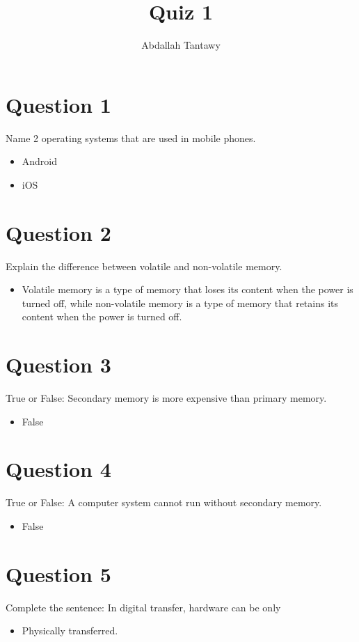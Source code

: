 \documentclass{article}
\title{Quiz 1}
\author{Abdallah Tantawy}
\begin{document}
\maketitle

\section*{Question 1}
Name 2 operating systems that are used in mobile phones.
\begin{itemize}[label=\alph*.]
    \item Android
    \item iOS
\end{itemize}

\section*{Question 2}
Explain the difference between volatile and non-volatile memory.
\begin{itemize}[label=\alph*.]
    \item Volatile memory is a type of memory that loses its content when the power is turned off, while non-volatile memory is a type of memory that retains its content when the power is turned off.
\end{itemize}

\section*{Question 3}
True or False: Secondary memory is more expensive than primary memory.
\begin{itemize}[label=\alph*.]
    \item False
\end{itemize}

\section*{Question 4}
True or False: A computer system cannot run without secondary memory.
\begin{itemize}[label=\alph*.]
    \item False
\end{itemize}

\section*{Question 5}
Complete the sentence: In digital transfer, hardware can be only
\begin{itemize}[label=\alph*.]
    \item Physically transferred.
\end{itemize}
\end{document}
